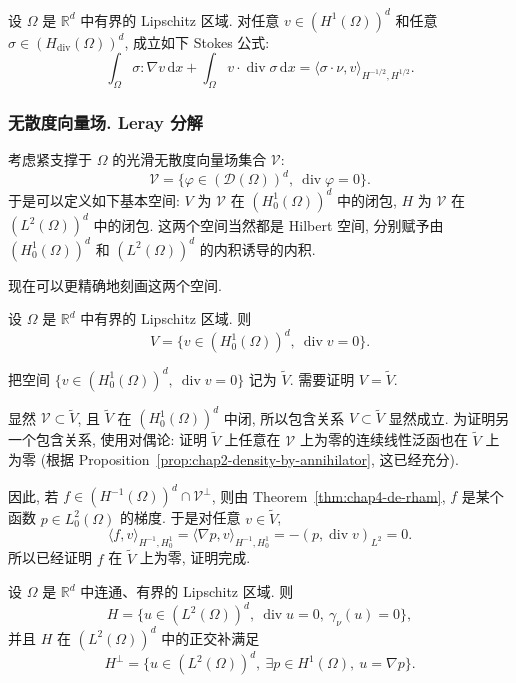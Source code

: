 \begin{Lemma}
\label{lem:chap4-tensor-stokes-formula}
设 $\Omega$ 是 $\mathbb R^d$ 中有界的 Lipschitz 区域. 对任意 $v\in(H^1(\Omega))^d$ 和任意 $\sigma\in(H_{\operatorname{div}}(\Omega))^d$, 成立如下 Stokes 公式:
\[
 \int_\Omega\sigma:\nabla v\,\mathrm dx
 +\int_\Omega v\cdot\operatorname{div}\sigma\,\mathrm dx
 =\langle\sigma\cdot\nu,v\rangle_{H^{-1/2},H^{1/2}}.
\]
\end{Lemma}

\subsubsection{无散度向量场. Leray 分解}
\label{subsec:chap4-leray-decomposition}

考虑紧支撑于 $\Omega$ 的光滑无散度向量场集合 $\mathcal V$:
\[
 \mathcal V=\{\varphi\in(\mathcal D(\Omega))^d,\ \operatorname{div}\varphi=0\}.
\]
于是可以定义如下基本空间: $V$ 为 $\mathcal V$ 在 $(H_0^1(\Omega))^d$ 中的闭包, $H$ 为 $\mathcal V$ 在 $(L^2(\Omega))^d$ 中的闭包. 这两个空间当然都是 Hilbert 空间, 分别赋予由 $(H_0^1(\Omega))^d$ 和 $(L^2(\Omega))^d$ 的内积诱导的内积.

现在可以更精确地刻画这两个空间.

\begin{Lemma}
\label{lem:chap4-divergence-free-h01-closure}
设 $\Omega$ 是 $\mathbb R^d$ 中有界的 Lipschitz 区域. 则
\[
 V=\{v\in(H_0^1(\Omega))^d,\ \operatorname{div}v=0\}.
\]
\end{Lemma}

\begin{Proof}
把空间 $\{v\in(H_0^1(\Omega))^d,\ \operatorname{div}v=0\}$ 记为 $\widetilde V$. 需要证明 $V=\widetilde V$.

显然 $\mathcal V\subset\widetilde V$, 且 $\widetilde V$ 在 $(H_0^1(\Omega))^d$ 中闭, 所以包含关系 $V\subset\widetilde V$ 显然成立. 为证明另一个包含关系, 使用对偶论: 证明 $\widetilde V$ 上任意在 $\mathcal V$ 上为零的连续线性泛函也在 $\widetilde V$ 上为零 (根据 Proposition~\ref{prop:chap2-density-by-annihilator}, 这已经充分).

因此, 若 $f\in(H^{-1}(\Omega))^d\cap\mathcal V^\perp$, 则由 Theorem~\ref{thm:chap4-de-rham}, $f$ 是某个函数 $p\in L_0^2(\Omega)$ 的梯度. 于是对任意 $v\in\widetilde V$,
\[
 \langle f,v\rangle_{H^{-1},H_0^1}
 =\langle\nabla p,v\rangle_{H^{-1},H_0^1}
 =-(p,\operatorname{div}v)_{L^2}=0.
\]
所以已经证明 $f$ 在 $\widetilde V$ 上为零, 证明完成.
\end{Proof}

\begin{Theorem}
\label{thm:chap4-leray-decomposition-characterization}
设 $\Omega$ 是 $\mathbb R^d$ 中连通、有界的 Lipschitz 区域. 则
\[
 H=\{u\in(L^2(\Omega))^d,\ \operatorname{div}u=0,\ \gamma_\nu(u)=0\},
\]
并且 $H$ 在 $(L^2(\Omega))^d$ 中的正交补满足
\begin{equation}
 H^\perp=\{u\in(L^2(\Omega))^d,\ \exists p\in H^1(\Omega),\ u=\nabla p\}.
 \label{eq:chap4-leray-orthogonal-gradient-space}
\end{equation}
\end{Theorem}

